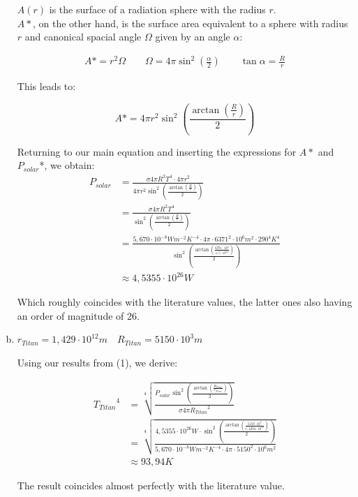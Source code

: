 \documentclass[a4paper,german,12pt]{scrartcl}
\begin{document}
\begin{enumerate}[(a)]
$A(r)$ is the surface of a radiation sphere with the radius $r$.\\
$A*$, on the other hand, is the surface area equivalent to a sphere with radius $r$ and canonical spacial angle $\Omega$ given by an angle $\alpha$:

\begin{align*}
A*=r^2\Omega \quad \quad \Omega=4\pi\sin^2(\frac{\alpha}{2}) \quad \quad \tan\alpha = \frac{R}{r}
\end{align*}

This leads to:

\begin{equation*}
A*=4\pi r^2\sin^2\left(\frac{\arctan(\frac{R}{r})}{2}\right)
\end{equation*}

Returning to our main equation and inserting the expressions for $A*$ and $P_{solar}$*, we obtain:
\begin{align*}
P_{solar}&=\frac{\sigma 4\pi R^2 T^4 \cdot 4 \pi r^2}{4\pi r^2\sin^2\left(\frac{\arctan(\frac{R}{r})}{2}\right)}\\
&=\frac{\sigma 4\pi R^2 T^4}{\sin^2\left(\frac{\arctan(\frac{R}{r})}{2}\right)}\\
&=\frac{5,670\cdot 10^{-8}Wm^{-2}K^{-4}\cdot 4\pi \cdot 6371^2\cdot 10^6m^2 \cdot 290^4K^4}{\sin^2\left(\frac{\arctan\left(\frac{6371\cdot 10^3}{1,5\cdot 10^{11}}\right)}{2}\right)}\\
&\approx 4,5355\cdot 10^{26}W
\end{align*}

Which roughly coincides with the literature values, the latter ones also having an order of magnitude of 26.

\item $r_{Titan}=1,429\cdot 10^{12}m \quad R_{Titan}=5150\cdot 10^3m$

Using our results from (1), we derive:

\begin{align*}
{T_{Titan}}^4&=\sqrt[4]{\frac{P_{solar} \sin^2\left(\frac{\arctan\left(\frac{R_{Titan}}{r_{Titan}}\right)}{2}\right)}{\sigma 4\pi {R_{Titan}}^2}}\\
&=\sqrt[4]{\frac{4,5355\cdot 10^{26}W\cdot \sin^2\left(\frac{\arctan\left(\frac{5150\cdot 10^3}{1,4294\cdot 10^{12}}\right)}{2}\right)}{5,670\cdot 10^{-8}Wm^{-2}K^{-4}\cdot 4\pi \cdot 5150^2\cdot 10^6m^2}}\\
&\approx 93,94K
\end{align*}

The result coincides almost perfectly with the literature value.


\end{enumerate}
\end{document}
